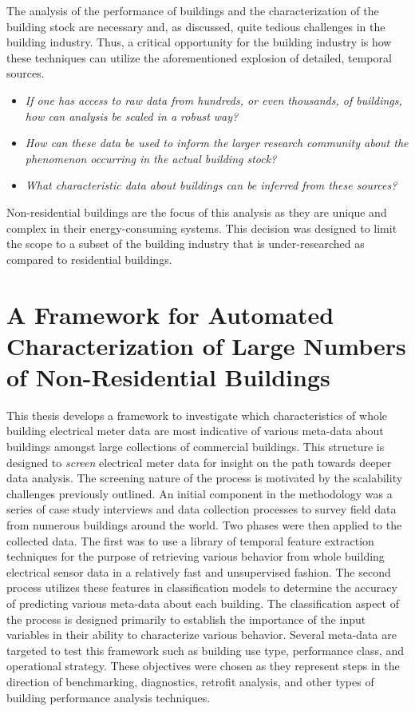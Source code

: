 The analysis of the performance of buildings and the characterization of the building stock are necessary and, as discussed, quite tedious challenges in the building industry. Thus, a critical opportunity for the building industry is how these techniques can utilize the aforementioned explosion of detailed, temporal sources. 

\begin{itemize}
  \item \emph{If one has access to raw data from hundreds, or even thousands, of buildings, how can analysis be scaled in a robust way?}
  \item \emph{How can these data be used to inform the larger research community about the phenomenon occurring in the actual building stock?}
  \item \emph{What characteristic data about buildings can be inferred from these sources?}
\end{itemize} 

Non-residential buildings are the focus of this analysis as they are unique and complex in their energy-consuming systems. This decision was designed to limit the scope to a subset of the building industry that is under-researched as compared to residential buildings.

\section{A Framework for Automated Characterization of Large Numbers of Non-Residential Buildings}
\label{sec:frameworkforanalysis}

This thesis develops a framework to investigate which characteristics of whole building electrical meter data are most indicative of various meta-data about buildings amongst large collections of commercial buildings. This structure is designed to \emph{screen} electrical meter data for insight on the path towards deeper data analysis. The screening nature of the process is motivated by the scalability challenges previously outlined. An initial component in the methodology was a series of case study interviews and data collection processes to survey field data from numerous buildings around the world. Two phases were then applied to the collected data. The first was to use a library of temporal feature extraction techniques for the purpose of retrieving various behavior from whole building electrical sensor data in a relatively fast and unsupervised fashion. The second process utilizes these features in classification models to determine the accuracy of predicting various meta-data about each building. The classification aspect of the process is designed primarily to establish the importance of the input variables in their ability to characterize various behavior. Several meta-data are targeted to test this framework such as building use type, performance class, and operational strategy. These objectives were chosen as they represent steps in the direction of benchmarking, diagnostics, retrofit analysis, and other types of building performance analysis techniques. 

